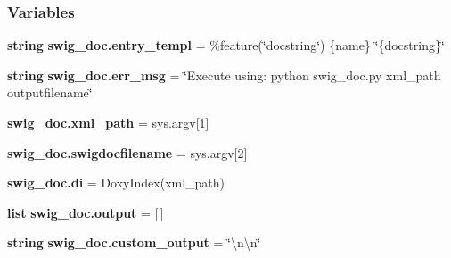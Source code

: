 \subsubsection*{Variables}
\begin{DoxyCompactItemize}
\item 
{\bf string} {\bf swig\+\_\+doc.\+entry\+\_\+templ} = \textquotesingle{}\%feature(\char`\"{}docstring\char`\"{}) \{name\} \char`\"{}\{docstring\}\char`\"{}\textquotesingle{}
\item 
{\bf string} {\bf swig\+\_\+doc.\+err\+\_\+msg} = \char`\"{}Execute using\+: python swig\+\_\+doc.\+py xml\+\_\+path outputfilename\char`\"{}
\item 
{\bf swig\+\_\+doc.\+xml\+\_\+path} = sys.\+argv[1]
\item 
{\bf swig\+\_\+doc.\+swigdocfilename} = sys.\+argv[2]
\item 
{\bf swig\+\_\+doc.\+di} = Doxy\+Index(xml\+\_\+path)
\item 
{\bf list} {\bf swig\+\_\+doc.\+output} = [$\,$]
\item 
{\bf string} {\bf swig\+\_\+doc.\+custom\+\_\+output} = \char`\"{}\textbackslash{}n\textbackslash{}n\char`\"{}
\end{DoxyCompactItemize}

